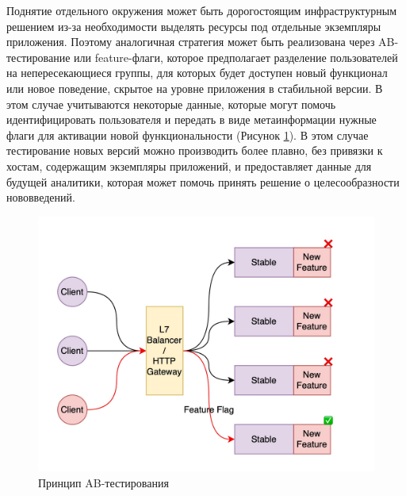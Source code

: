 Поднятие отдельного окружения может быть дорогостоящим инфраструктурным решением из-за необходимости
выделять ресурсы под отдельные экземпляры приложения. Поэтому аналогичная стратегия может быть
реализована через AB-тестирование или feature-флаги, которое предполагает разделение
пользователей на непересекающиеся группы, для которых будет доступен новый функционал или новое поведение,
скрытое на уровне приложения в стабильной версии. В этом случае учитываются некоторые данные,
которые могут помочь идентифицировать пользователя и передать в виде метаинформации нужные флаги
для активации новой функциональности (Рисунок \ref{fig:ab}). В этом случае тестирование новых версий можно производить более плавно, без
привязки к хостам, содержащим экземпляры приложений, и предоставляет данные для будущей
аналитики, которая может помочь принять решение о целесообразности нововведений.

\begin{figure}[H]
    \centering
    \includegraphics[width=0.8\linewidth]{img/ab.jpg}
    \caption{Принцип AB-тестирования}
    \label{fig:ab}
\end{figure}

